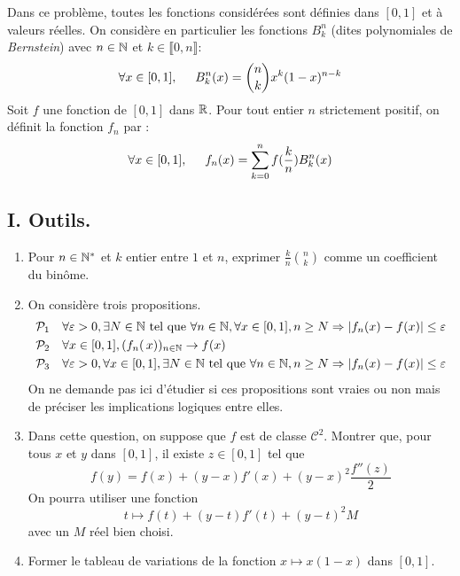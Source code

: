 Dans ce probl{\`e}me, toutes les fonctions considérées sont définies dans $[0,1]$ et à valeurs réelles. On considère en particulier les fonctions $B_k^n$ (dites polynomiales de \emph{Bernstein}) avec $n\in \mathbb{N}$ et $k\in \llbracket 0, n \rrbracket$:
\begin{displaymath}
 \forall x \in[0,1],\hspace{0.5cm} B_k^n(x)= \binom{n}{k}x^k(1-x)^{n-k}
\end{displaymath}
 Soit $f$ une fonction de $[0,1]$ dans $\mathbb{R}$. Pour tout entier $n$ strictement positif, on d{\'e}finit la
fonction $f_n$ par :
\begin{displaymath}
 \forall x \in [0,1],\hspace{0.5cm} f_n(x)=\sum_{k=0}^n  f(\frac{k}{n})B^n_k(x)
\end{displaymath}
\subsection*{I. Outils.}
\begin{enumerate}
 \item Pour $n\in \mathbb{N}^*$ et $k$ entier entre $1$ et $n$, exprimer $\frac{k}{n}\binom{n}{k}$ comme un coefficient du binôme.

 \item On considère trois propositions.
\begin{align*}
 &\mathcal{P}_1& &\forall \varepsilon>0 , \exists N\in \mathbb{N} \text{ tel que }\forall n\in \mathbb{N}, \forall x\in [0,1], n\geq N\Rightarrow |f_n(x) - f(x)|\leq \varepsilon\\ 
 &\mathcal{P}_2&  &\forall x\in [0,1] , \left( f_n\right(x)) _{n\in \mathbb{N}} \rightarrow f(x) \\
 &\mathcal{P}_3& &\forall \varepsilon>0 , \forall x\in [0,1], \exists N\in \mathbb{N} \text{ tel que }\forall n\in \mathbb{N},  n\geq N\Rightarrow |f_n(x) - f(x)|\leq \varepsilon
\end{align*}
On ne demande pas ici d'étudier si ces propositions sont vraies ou non mais de préciser les implications logiques entre elles.

\item Dans cette question, on suppose que $f$ est de classe $\mathcal{C}^2$. Montrer que, pour tous $x$ et $y$ dans $[0,1]$, il existe $z\in[0,1]$ tel que 
\begin{displaymath}
 f(y) = f(x) + (y-x)f'(x) +(y-x)^2\frac{f''(z)}{2}
\end{displaymath}
On pourra utiliser une fonction
\begin{displaymath}
 t \mapsto f(t) + (y-t)f'(t) + (y-t)^2M
\end{displaymath}
avec un $M$ réel bien choisi.

\item Former le tableau de variations de la fonction $x\mapsto x(1-x)$ dans $[0,1]$.
\end{enumerate}


